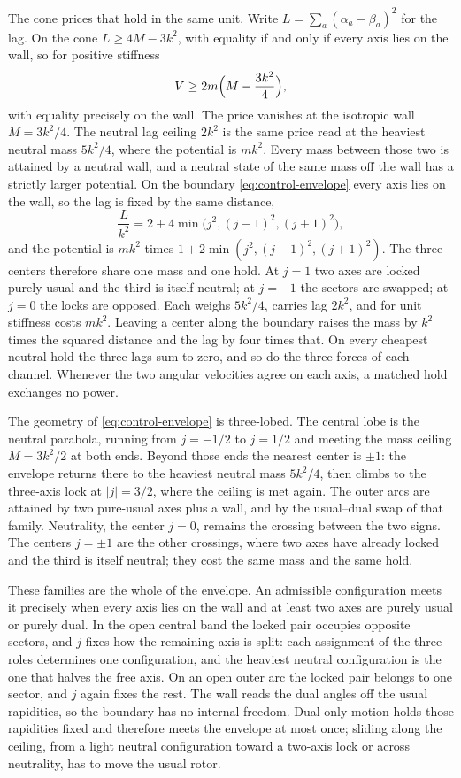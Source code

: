 \documentclass[a4paper]{article}
\begin{document}
The cone prices that hold in the same unit. Write $L=\sum_a(\alpha_a-\beta_a)^2$ for the lag. On the cone $L\ge 4M-3k^2$, with equality if and only if every axis lies on the wall, so for positive stiffness
\[
V\ge 2m\Bigl(M-\frac{3k^2}{4}\Bigr),
\]
with equality precisely on the wall. The price vanishes at the isotropic wall $M=3k^2/4$. The neutral lag ceiling $2k^2$ is the same price read at the heaviest neutral mass $5k^2/4$, where the potential is $mk^2$. Every mass between those two is attained by a neutral wall, and a neutral state of the same mass off the wall has a strictly larger potential. On the boundary \eqref{eq:control-envelope} every axis lies on the wall, so the lag is fixed by the same distance,
\begin{equation}
\label{eq:hold-on-envelope}
\frac{L}{k^2}=2+4\min\bigl(j^2,(j-1)^2,(j+1)^2\bigr),
\end{equation}
and the potential is $mk^2$ times $1+2\min(j^2,(j-1)^2,(j+1)^2)$. The three centers therefore share one mass and one hold. At $j=1$ two axes are locked purely usual and the third is itself neutral; at $j=-1$ the sectors are swapped; at $j=0$ the locks are opposed. Each weighs $5k^2/4$, carries lag $2k^2$, and for unit stiffness costs $mk^2$. Leaving a center along the boundary raises the mass by $k^2$ times the squared distance and the lag by four times that. On every cheapest neutral hold the three lags sum to zero, and so do the three forces of each channel. Whenever the two angular velocities agree on each axis, a matched hold exchanges no power.

The geometry of \eqref{eq:control-envelope} is three-lobed. The central lobe is the neutral parabola, running from $j=-1/2$ to $j=1/2$ and meeting the mass ceiling $M=3k^2/2$ at both ends. Beyond those ends the nearest center is $\pm 1$: the envelope returns there to the heaviest neutral mass $5k^2/4$, then climbs to the three-axis lock at $|j|=3/2$, where the ceiling is met again. The outer arcs are attained by two pure-usual axes plus a wall, and by the usual--dual swap of that family. Neutrality, the center $j=0$, remains the crossing between the two signs. The centers $j=\pm 1$ are the other crossings, where two axes have already locked and the third is itself neutral; they cost the same mass and the same hold.

These families are the whole of the envelope. An admissible configuration meets it precisely when every axis lies on the wall and at least two axes are purely usual or purely dual. In the open central band the locked pair occupies opposite sectors, and $j$ fixes how the remaining axis is split: each assignment of the three roles determines one configuration, and the heaviest neutral configuration is the one that halves the free axis. On an open outer arc the locked pair belongs to one sector, and $j$ again fixes the rest. The wall reads the dual angles off the usual rapidities, so the boundary has no internal freedom. Dual-only motion holds those rapidities fixed and therefore meets the envelope at most once; sliding along the ceiling, from a light neutral configuration toward a two-axis lock or across neutrality, has to move the usual rotor.
\end{document}
